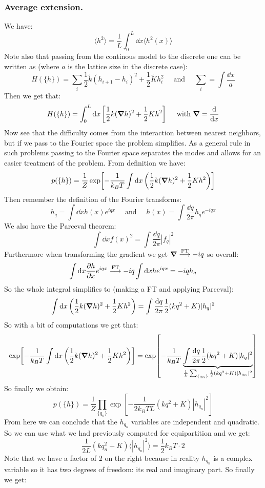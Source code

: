 \documentclass[10pt,a4paper]{book}
\begin{document}
\subsubsection{Average extension.}
We have:
\[
\langle h^2 \rangle = \frac{1}{L} \int_0^L \dd x \langle h^2(x) \rangle
\]
Note also that passing from the continous model to the discrete one can be written as (where $a$ is the lattice size in the discrete case):
\[
H(\{h\}) = \sum_i \frac{1}{2}\tilde{k}(h_{i+1} - h_i)^2 + \frac{1}{2}\tilde{K} h_i^2 \quad \text{ and } \quad \sum_i = \int \frac{\dd x}{a}
\]
Then we get that:
\[
H(\{h\}) = \int_0^L \dd x \left[ \frac{1}{2} k (\grad h)^2 + \frac{1}{2} K h^2\right] \quad \text{ with } \grad = \dv{}{x}
\]
Now see that the difficulty comes from the interaction between nearest neighbors, but if we pass to the Fourier space the problem simplifies. As a general rule in such problems passing to the Fourier space separates the modes and allows for an easier treatment of the problem. From definition we have:
\[
p(\{h\}) = \frac{1}{Z} \exp[-\frac{1}{k_B T} \int \dd x \left(\frac{1}{2} k(\grad h)^2 + \frac{1}{2} K h^2\right)]
\]
Then remember the definition of the Fourier transforms:
\[
h_q = \int \dd x h(x) e^{iqx} \quad \text{ and } \quad h(x) = \int \frac{\dd q}{2 \pi} h_q e^{-iqx}
\]
We also have the Parceval theorem:
\[
\int \dd x f(x)^2 = \int \frac{\dd q}{2 \pi} |f_q|^2
\]
Furthermore when transforming the gradient we get $\grad \stackrel{\text{FT}}{\longrightarrow} - iq$ so overall:
\[
\int \dd x \pdv{h}{x} e^{iqx} \stackrel{\text{FT}}{\longrightarrow} -iq \int \dd x h e^{iqx} = -iq h_q
\]
So the whole integral simplifies to (making a FT and applying Parceval):
\[
\int \dd x \left(\frac{1}{2} k(\grad h)^2 + \frac{1}{2} K h^2\right)  = \int \frac{\dd q}{2 \pi} \frac{1}{2} (kq^2 + K) |h_q|^2
\]
So with a bit of computations we get that:
\[
\exp[-\frac{1}{k_B T} \int \dd x \left(\frac{1}{2} k(\grad h)^2 + \frac{1}{2} K h^2\right)] = \exp[-\frac{1}{k_B T}\underbrace{\int \frac{\dd q}{2\pi} \frac{1}{2} (kq^2 + K) |h_q|^2}_{\frac{1}{L}\sum_{\{q_n\}} \frac{1}{2} (kq^2 + K) |h_{q_n}|^2}]
\]
So finally we obtain:
\[
p(\{h\}) = \frac{1}{Z}\prod_{\{q_n\}} \exp[-\frac{1}{2k_B T L} (k q^2 + K) |h_{q_n}|^2]
\]
From here we can conclude that the $h_{q_n}$ variables are independent and quadratic. So we can use what we had previously computed for equipartition and we get:
\[
\frac{1}{2L} (kq_n^2 + K) \langle |h_{q_n}|^2 \rangle = \frac{1}{2} k_B T \cdot 2
\]
Note that we have a factor of 2 on the right because in reality $h_{q_n}$ is a complex variable so it has two degrees of freedom: its real and imaginary part. So finally we get:
\end{document}
